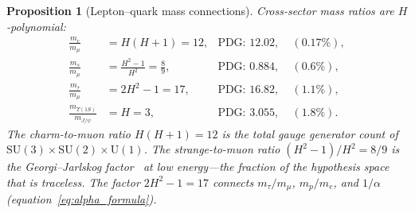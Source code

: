 \documentclass[11pt,a4paper]{article}
\newtheorem{proposition}[theorem]{Proposition}
\theoremstyle{definition}
\theoremstyle{remark}
\newcommand{\SU}{\mathrm{SU}}
\begin{document}
\begin{proposition}[Lepton--quark mass connections]\label{prop:cross_sector}
Cross-sector mass ratios are $H$-polynomial:
\begin{align}
\frac{m_c}{m_\mu} &= H(H+1) = 12, &\text{PDG: }12.02,\;&(0.17\%), \label{eq:mc_mmu}\\
\frac{m_s}{m_\mu} &= \frac{H^2-1}{H^2} = \frac{8}{9}, &\text{PDG: }0.884,\;&(0.6\%), \label{eq:ms_mmu}\\
\frac{m_\tau}{m_\mu} &= 2H^2-1 = 17, &\text{PDG: }16.82,\;&(1.1\%), \label{eq:mtau_mmu}\\
\frac{m_{\Upsilon(1S)}}{m_{J/\psi}} &= H = 3, &\text{PDG: }3.055,\;&(1.8\%). \label{eq:ups_jpsi}
\end{align}
The charm-to-muon ratio $H(H+1)=12$ is the total gauge generator count of $\SU(3)\times\SU(2)\times\mathrm{U}(1)$. The strange-to-muon ratio $(H^2-1)/H^2=8/9$ is the Georgi--Jarlskog factor~\cite{GeorgiJarlskog1979} at low energy---the fraction of the hypothesis space that is traceless. The factor $2H^2-1=17$ connects $m_\tau/m_\mu$, $m_p/m_e$, and $1/\alpha$ (equation~\ref{eq:alpha_formula}).
\end{proposition}
\end{document}
